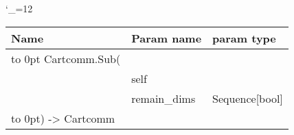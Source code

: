 \begingroup \catcode`\_=12 \tt
\begin{tabular}{lll}
\toprule
\textrm{Name}&\textrm{Param name}&\textrm{param type}\\
\midrule
\hbox to 0pt {Cartcomm.Sub(\hss}\\
& self\\
& remain_dims & Sequence[bool]\\
\hbox to 0pt{) -> Cartcomm\hss}\\
\bottomrule
\end{tabular}
\endgroup
